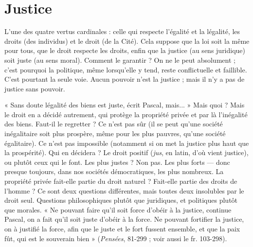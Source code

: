 
\section{Justice}
L'une des quatre vertus cardinales : celle qui respecte l’égalité et la
légalité, les droits (des individus) et le droit (de la Cité). Cela suppose
que la loi soit la même pour tous, que le droit respecte les droits, enfin que
la justice (au sens juridique) soit juste (au sens moral). Comment le garantir ?
On ne le peut absolument ; c’est pourquoi la politique, même lorsqu'elle y
tend, reste conflictuelle et faillible. C’est pourtant la seule voie. Aucun pouvoir
n’est la justice ; mais il n’y a pas de justice sans pouvoir.

« Sans doute légalité des biens est juste, écrit Pascal, mais... » Mais quoi ?
Mais le droit en a décidé autrement, qui protège la propriété privée et par là
l’inégalité des biens. Faut-il le regretter ? Ce n’est pas sûr (il se peut qu’une
société inégalitaire soit plus prospère, même pour les plus pauvres, qu’une
société égalitaire). Ce n’est pas impossible (notamment si on met la justice plus
haut que la prospérité). Qui en décidera ? Le droit positif ({\it jus}, en latin, d’où
vient justice), ou plutôt ceux qui le font. Les plus justes ? Non pas. Les plus
forts — donc presque toujours, dans nos sociétés démocratiques, les plus nombreux.
La propriété privée fait-elle partie du droit naturel ? Fait-elle partie des
droits de l’homme ? Ce sont deux questions différentes, mais toutes deux insolubles
par le droit seul. Questions philosophiques plutôt que juridiques, et politiques
plutôt que morales. « Ne pouvant faire qu’il soit force d’obéir à la justice,
continue Pascal, on a fait qu’il soit juste d’obéir à la force. Ne pouvant fortifier
la justice, on à justifié la force, afin que le juste et le fort fussent ensemble, et
que la paix fût, qui est le souverain bien » ({\it Pensées}, 81-299 ; voir aussi le
fr. 103-298).

